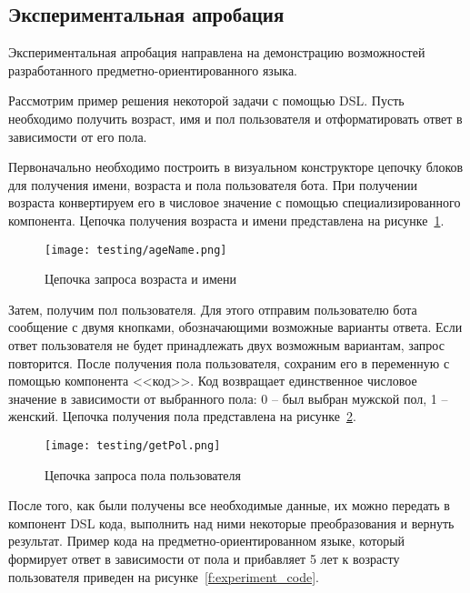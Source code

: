\subsection{Экспериментальная апробация}

Экспериментальная апробация направлена на демонстрацию возможностей разработанного предметно-ориентированного языка.

Рассмотрим пример решения некоторой задачи с помощью DSL.
Пусть необходимо получить возраст, имя и пол пользователя и отформатировать ответ в зависимости от его пола.

Первоначально необходимо построить в визуальном конструкторе цепочку блоков для получения имени, возраста и пола пользователя бота.
При получении возраста конвертируем его в числовое значение с помощью специализированного компонента.
Цепочка получения возраста и имени представлена на рисунке~\ref{f:experimentAgeName}.

\begin{figure}[ht]
	\centering
	\vspace{\toppaddingoffigure}
	\texttt{[image: testing/ageName.png]}
	\caption{Цепочка запроса возраста и имени}
	\label{f:experimentAgeName}
\end{figure}

Затем, получим пол пользователя. Для этого отправим пользователю бота сообщение с двумя кнопками,
обозначающими возможные варианты ответа. Если ответ пользователя не будет принадлежать двух возможным вариантам, запрос повторится.
После получения пола пользователя, сохраним его в переменную с помощью компонента <<код>>.
Код возвращает единственное числовое значение в зависимости от выбранного пола: 0 -- был выбран мужской пол, 1 -- женский.
Цепочка получения пола представлена на рисунке~\ref{f:experimentPol}.

\begin{figure}[ht]
	\centering
	\vspace{\toppaddingoffigure}
	\texttt{[image: testing/getPol.png]}
	\caption{Цепочка запроса пола пользователя}
	\label{f:experimentPol}
\end{figure}


После того, как были получены все необходимые данные, их можно передать в компонент DSL кода, выполнить над ними некоторые преобразования и вернуть результат.
Пример кода на предметно-ориентированном языке, который формирует ответ в зависимости от пола и прибавляет 5 лет к возрасту пользователя приведен на рисунке~\ref{f:experiment_code}.

